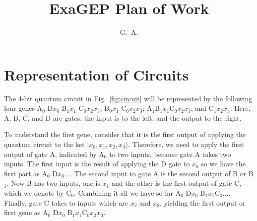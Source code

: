 \documentclass{article}
\begin{document}
	
\title{ExaGEP Plan of Work}

\author{G.~A.}

\maketitle

\section{Representation of Circuits}

The 4-bit quantum circuit in Fig.~\ref{fig:circuit} will be represented
by the following four genes A$_0$ D$x_0$  B$_1x_1$ C$_0x_2x_3$;
 B$_0x_1$ C$_0x_2x_3$; A$_1$B$_1x_1$C$_0x_2 x_3$; and C$_1x_2x_3$.
Here, A, B, C, and D are gates, the input is to the left, and the output to the right.
 
To understand the first gene, consider that it is the first output of applying
the quantum circuit to the ket $|x_0, x_1, x_2, x_3\rangle$. Therefore, we need
to apply the first output of gate A, indicated by A$_0$ to two inputs, because
gate A takes two inputs. The first input is the result of applying the D gate
to $x_0$ so we have the first part as A$_0$ D$x_0\ldots$. The second input to gate
A is the second output of B or B$_1$. Now B has two inputs, one is $x_1$ and the other is
the first output of gate C, which we denote by C$_0$. Combining it all we have so far
A$_0$ D$x_0$ B$_1x_1$C$_0\ldots$. Finally, gate C takes to inputs which are $x_2$ and $x_3$,
yielding the first output or first gene as A$_0$ D$x_0$ B$_1x_1$C$_0x_2x_3$.
\end{document}
